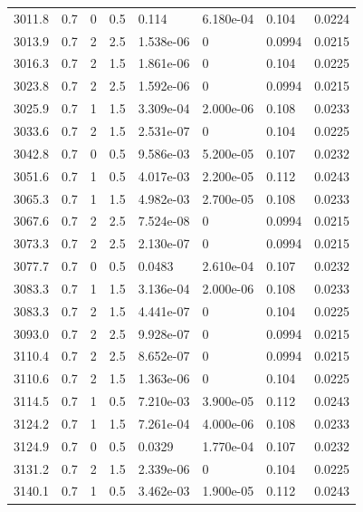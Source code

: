 \documentclass[preview]{standalone}
\begin{document}
{{{{{{{{{{{\begin{tabular}{L{1.2cm}C{1.2cm} C{0.3cm}C{0.5cm} C{1.4cm}C{1.4cm} C{1.4cm}C{1.4cm}}
  3011.8  &   0.7  & 0     & 0.5 &  0.114  & 6.180e-04  & 0.104 &  0.0224   \\ 
  3013.9  &   0.7  & 2     & 2.5 &  1.538e-06  & 0  & 0.0994 &  0.0215   \\ 
  3016.3  &   0.7  & 2     & 1.5 &  1.861e-06  & 0  & 0.104 &  0.0225   \\ 
  3023.8  &   0.7  & 2     & 2.5 &  1.592e-06  & 0  & 0.0994 &  0.0215   \\ 
  3025.9  &   0.7  & 1     & 1.5 &  3.309e-04  & 2.000e-06  & 0.108 &  0.0233   \\ 
  3033.6  &   0.7  & 2     & 1.5 &  2.531e-07  & 0  & 0.104 &  0.0225   \\ 
  3042.8  &   0.7  & 0     & 0.5 &  9.586e-03  & 5.200e-05  & 0.107 &  0.0232   \\ 
  3051.6  &   0.7  & 1     & 0.5 &  4.017e-03  & 2.200e-05  & 0.112 &  0.0243   \\ 
  3065.3  &   0.7  & 1     & 1.5 &  4.982e-03  & 2.700e-05  & 0.108 &  0.0233   \\ 
  3067.6  &   0.7  & 2     & 2.5 &  7.524e-08  & 0  & 0.0994 &  0.0215   \\ 
  3073.3  &   0.7  & 2     & 2.5 &  2.130e-07  & 0  & 0.0994 &  0.0215   \\ 
  3077.7  &   0.7  & 0     & 0.5 &  0.0483  & 2.610e-04  & 0.107 &  0.0232   \\ 
  3083.3  &   0.7  & 1     & 1.5 &  3.136e-04  & 2.000e-06  & 0.108 &  0.0233   \\ 
  3083.3  &   0.7  & 2     & 1.5 &  4.441e-07  & 0  & 0.104 &  0.0225   \\ 
  3093.0  &   0.7  & 2     & 2.5 &  9.928e-07  & 0  & 0.0994 &  0.0215   \\ 
  3110.4  &   0.7  & 2     & 2.5 &  8.652e-07  & 0  & 0.0994 &  0.0215   \\ 
  3110.6  &   0.7  & 2     & 1.5 &  1.363e-06  & 0  & 0.104 &  0.0225   \\ 
  3114.5  &   0.7  & 1     & 0.5 &  7.210e-03  & 3.900e-05  & 0.112 &  0.0243   \\ 
  3124.2  &   0.7  & 1     & 1.5 &  7.261e-04  & 4.000e-06  & 0.108 &  0.0233   \\ 
  3124.9  &   0.7  & 0     & 0.5 &  0.0329  & 1.770e-04  & 0.107 &  0.0232   \\ 
  3131.2  &   0.7  & 2     & 1.5 &  2.339e-06  & 0  & 0.104 &  0.0225   \\ 
  3140.1  &   0.7  & 1     & 0.5 &  3.462e-03  & 1.900e-05  & 0.112 &  0.0243   \\ 

\end{tabular}}}}}}}}}}}}
\end{document}
